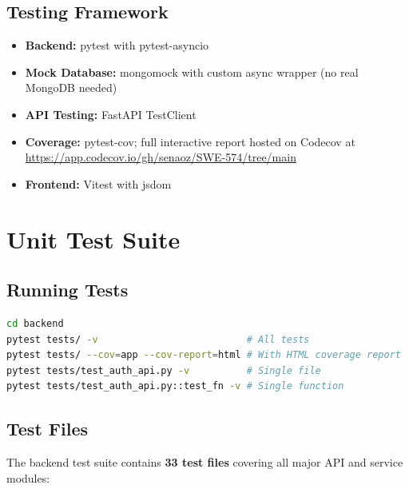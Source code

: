 \documentclass[11pt,a4paper]{report}
\begin{document}
\subsection{Testing Framework}

\begin{itemize}
    \item \textbf{Backend:} pytest with pytest-asyncio
    \item \textbf{Mock Database:} mongomock with custom async wrapper (no real MongoDB needed)
    \item \textbf{API Testing:} FastAPI TestClient
    \item \textbf{Coverage:} pytest-cov; full interactive report hosted on Codecov at \url{https://app.codecov.io/gh/senaoz/SWE-574/tree/main}
    \item \textbf{Frontend:} Vitest with jsdom
\end{itemize}

\section{Unit Test Suite}

\subsection{Running Tests}

\begin{lstlisting}[language=bash]
cd backend
pytest tests/ -v                          # All tests
pytest tests/ --cov=app --cov-report=html # With HTML coverage report
pytest tests/test_auth_api.py -v          # Single file
pytest tests/test_auth_api.py::test_fn -v # Single function
\end{lstlisting}

\subsection{Test Files}

The backend test suite contains \textbf{33 test files} covering all major API and service modules:
\end{document}
